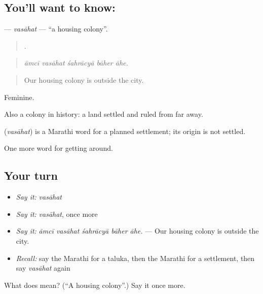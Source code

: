 \subsection*{You'll want to know: }
\textbf{} — \emph{vasāhat} — \textquotedblleft{}a housing colony\textquotedblright{}.

\begin{quote}
    .
\end{quote}

\begin{quote}
\emph{āmcī vasāhat śahrācyā bāher āhe.}
\end{quote}

\begin{quote}
Our housing colony is outside the city.
\end{quote}

Feminine.

Also a colony in history: a land settled and ruled from far away.

\begin{cousinweb}
\textbf{} (\emph{vasāhat}) is a Marathi word for a planned settlement; its origin is not settled.
\end{cousinweb}

\begin{grammarlens}[title={What you've built}]
One more word for getting around.
\end{grammarlens}

\subsection*{Your turn}
\begin{itemize}
\raggedright
  \item \emph{Say it:} \emph{vasāhat}
  \item \emph{Say it:} \emph{vasāhat}, once more
  \item \emph{Say it:} \emph{āmcī vasāhat śahrācyā bāher āhe.} — Our housing colony is outside the city.
  \item \emph{Recall:} say the Marathi for a taluka, then the Marathi for a settlement, then say \emph{vasāhat} again
\end{itemize}

\begin{tcolorbox}[breakable,colback=teal!4,colframe=teal!35!black,title={Before you move on}]
What does  mean? (\textquotedblleft{}A housing colony\textquotedblright{}.) Say it once more.
\end{tcolorbox}
